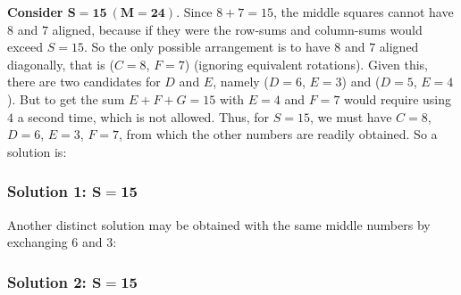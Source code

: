 \documentclass[12pt]{article}
\begin{document}
\textbf{Consider $\mathbf{S=15~(M=24)}$}. Since $8+7=15$, the middle squares cannot have $8$ and $7$ aligned, because if they were the row-sums and column-sums would exceed $S=15$. So the only possible arrangement is to have $8$ and $7$ aligned diagonally, that is ($C=8$, $F=7$) (ignoring equivalent rotations). Given this, there are two candidates for $D$ and $E$, namely ($D=6$, $E=3$) and ($D=5$, $E=4$). But to get the sum $E+F+G=15$ with $E=4$ and $F=7$ would require using $4$ a second time, which is not allowed. Thus, for $S=15$, we must have $C=8$, $D=6$, $E=3$, $F=7$, from which the other numbers are readily obtained. So a solution is:
\begin{center}
\subsubsection*{Solution 1: $\mathbf{S=15}$}
\end{center}

Another distinct solution may be obtained with the same middle numbers by exchanging $6$ and $3$:
\begin{center}
\subsubsection*{Solution 2: $\mathbf{S=15}$}
\end{center}
\end{document}
